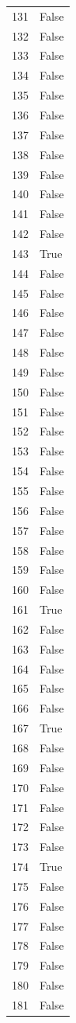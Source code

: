 \documentclass[
  letterpaper,
  DIV=11,
  numbers=noendperiod]{scrreprt}
\begin{document}
\begin{tabular}{ll}
131 &  False \\
132 &  False \\
133 &  False \\
134 &  False \\
135 &  False \\
136 &  False \\
137 &  False \\
138 &  False \\
139 &  False \\
140 &  False \\
141 &  False \\
142 &  False \\
143 &   True \\
144 &  False \\
145 &  False \\
146 &  False \\
147 &  False \\
148 &  False \\
149 &  False \\
150 &  False \\
151 &  False \\
152 &  False \\
153 &  False \\
154 &  False \\
155 &  False \\
156 &  False \\
157 &  False \\
158 &  False \\
159 &  False \\
160 &  False \\
161 &   True \\
162 &  False \\
163 &  False \\
164 &  False \\
165 &  False \\
166 &  False \\
167 &   True \\
168 &  False \\
169 &  False \\
170 &  False \\
171 &  False \\
172 &  False \\
173 &  False \\
174 &   True \\
175 &  False \\
176 &  False \\
177 &  False \\
178 &  False \\
179 &  False \\
180 &  False \\
181 &  False \\
\bottomrule
\end{tabular}
\end{document}
